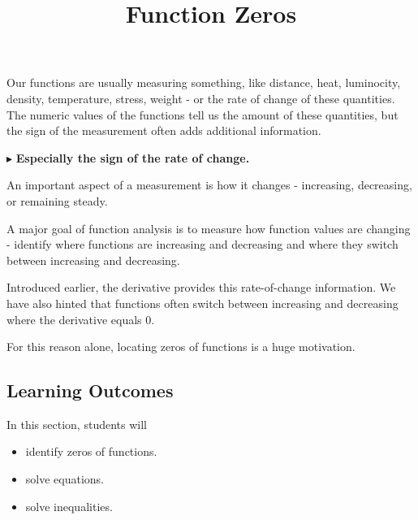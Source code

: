 \documentclass{ximera}
\title{Function Zeros}
\begin{document}
\begin{abstract}
\end{abstract}
\maketitle




Our functions are usually measuring something, like distance, heat, luminocity, density, temperature, stress, weight - or the rate of change of these quantities.  The numeric values of the functions tell us the amount of these quantities, but the sign of the measurement often adds additional information. 


$\blacktriangleright$ \textbf{\textcolor{blue!55!black}{Especially the sign of the rate of change.}}   



An important aspect of a measurement is how it changes - increasing, decreasing, or remaining steady. 





A major goal of function analysis is to measure how function values are changing - identify where functions are increasing and decreasing and where they switch between increasing and decreasing.




Introduced earlier, the derivative provides this rate-of-change information.  We have also hinted that functions often switch between increasing and decreasing where the derivative equals $0$.

For this reason alone, locating zeros of functions is a huge motivation.







\subsection*{Learning Outcomes}


\begin{sectionOutcomes}
In this section, students will 

\begin{itemize}
\item identify zeros of functions.
\item solve equations.
\item solve inequalities.
\end{itemize}
\end{sectionOutcomes}
\end{document}
